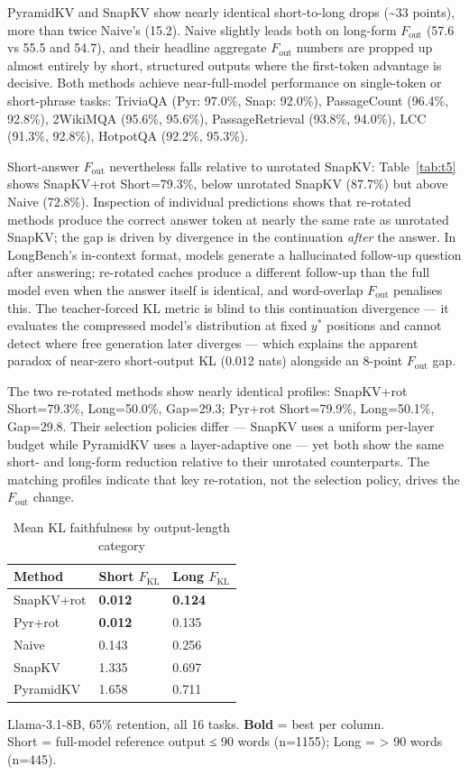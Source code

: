\documentclass[10pt,letterpaper]{article}
\begin{document}
PyramidKV and SnapKV show nearly identical short-to-long drops
(\textasciitilde33 points), more than twice Naive's (15.2). Naive
slightly leads both on long-form \(F_{\text{out}}\) (57.6 vs 55.5 and
54.7), and their headline aggregate \(F_{\text{out}}\) numbers are
propped up almost entirely by short, structured outputs where the
first-token advantage is decisive. Both methods achieve near-full-model
performance on single-token or short-phrase tasks: TriviaQA (Pyr:
97.0\%, Snap: 92.0\%), PassageCount (96.4\%, 92.8\%), 2WikiMQA (95.6\%,
95.6\%), PassageRetrieval (93.8\%, 94.0\%), LCC (91.3\%, 92.8\%),
HotpotQA (92.2\%, 95.3\%).

Short-answer \(F_{\text{out}}\) nevertheless falls relative to unrotated
SnapKV: Table~\ref{tab:t5} shows SnapKV+rot Short=79.3\%, below unrotated
SnapKV (87.7\%) but above Naive (72.8\%). Inspection of individual
predictions shows that re-rotated methods produce the correct answer token
at nearly the same rate as unrotated SnapKV; the gap is driven by
divergence in the continuation \emph{after} the answer. In LongBench's
in-context format, models generate a hallucinated follow-up question after
answering; re-rotated caches produce a different follow-up than the full
model even when the answer itself is identical, and word-overlap
\(F_{\text{out}}\) penalises this. The teacher-forced KL metric is blind to
this continuation divergence --- it evaluates the compressed model's
distribution at fixed \(y^*\) positions and cannot detect where free
generation later diverges --- which explains the apparent paradox of
near-zero short-output KL (0.012 nats) alongside an 8-point
\(F_{\text{out}}\) gap.

The two re-rotated methods show nearly identical profiles: SnapKV+rot
Short=79.3\%, Long=50.0\%, Gap=29.3; Pyr+rot Short=79.9\%, Long=50.1\%,
Gap=29.8. Their selection policies differ --- SnapKV uses a uniform
per-layer budget while PyramidKV uses a layer-adaptive one --- yet both
show the same short- and long-form reduction relative to their unrotated
counterparts. The matching profiles indicate that key re-rotation, not
the selection policy, drives the \(F_{\text{out}}\) change.

\begin{table}[H]
\centering
\small
\caption{Mean KL faithfulness by output-length category}
\label{tab:t6}
\begin{tabular}{@{}lll@{}}
\toprule
Method & Short \(F_{\text{KL}}\) & Long \(F_{\text{KL}}\)\\
\midrule
SnapKV+rot & \textbf{0.012} & \textbf{0.124}\\
Pyr+rot & \textbf{0.012} & 0.135\\
Naive & 0.143 & 0.256\\
SnapKV & 1.335 & 0.697\\
PyramidKV & 1.658 & 0.711\\
\bottomrule
\end{tabular}
\center
Llama-3.1-8B, 65\% retention, all 16 tasks. \textbf{Bold} = best per column.  
\\Short = full-model reference output ≤ 90 words (n=1155); Long =
\textgreater{} 90 words (n=445).
\end{table}
\end{document}
